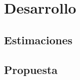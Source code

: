 \documentclass[letterpaper]{article}
\begin{document}
\newpage{}

\section{Desarrollo}\label{sec:ana}



\subsection{Estimaciones}\label{sec:sc}



\subsection{Propuesta}\label{sec:pro}



\newpage{}

\printglossary{}

\newpage{}

\listoftables
\listoffigures
\end{document}
